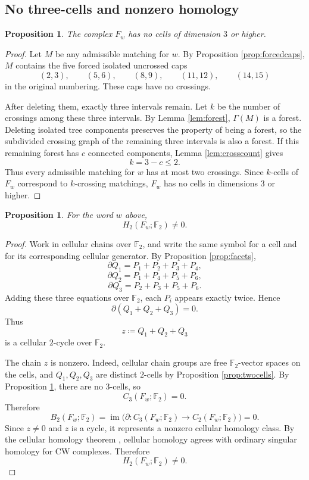 \documentclass[12pt]{article}
\newcommand{\Ftwo}{\mathbb{F}_2}
\newcommand{\defeq}{\coloneqq}
\newtheorem{proposition}[theorem]{Proposition}
\theoremstyle{definition}
\begin{document}
\subsection{No three-cells and nonzero homology}

\begin{proposition}\label{prop:nohigh}
The complex \(F_w\) has no cells of dimension \(3\) or higher.
\end{proposition}

\begin{proof}
Let \(M\) be any admissible matching for \(w\).  By Proposition \ref{prop:forcedcaps}, \(M\) contains the five forced isolated uncrossed caps
\[
(2,3),\qquad (5,6),\qquad (8,9),\qquad (11,12),\qquad (14,15)
\]
in the original numbering.  These caps have no crossings.

After deleting them, exactly three intervals remain.  Let \(k\) be the number of crossings among these three intervals.  By Lemma \ref{lem:forest}, \(\Gamma(M)\) is a forest.  Deleting isolated tree components preserves the property of being a forest, so the subdivided crossing graph of the remaining three intervals is also a forest.  If this remaining forest has \(c\) connected components, Lemma \ref{lem:crosscount} gives
\[
k=3-c\le 2.
\]
Thus every admissible matching for \(w\) has at most two crossings.  Since \(k\)-cells of \(F_w\) correspond to \(k\)-crossing matchings, \(F_w\) has no cells in dimensions \(3\) or higher.
\end{proof}

\begin{proposition}\label{prop:homology}
For the word \(w\) above,
\[
H_2(F_w;\Ftwo)\neq 0.
\]
\end{proposition}

\begin{proof}
Work in cellular chains over \(\Ftwo\), and write the same symbol for a cell and for its corresponding cellular generator.  By Proposition \ref{prop:facets},
\[
\partial Q_1=P_1+P_2+P_3+P_4,
\]
\[
\partial Q_2=P_1+P_4+P_5+P_6,
\]
\[
\partial Q_3=P_2+P_3+P_5+P_6.
\]
Adding these three equations over \(\Ftwo\), each \(P_i\) appears exactly twice.  Hence
\[
\partial(Q_1+Q_2+Q_3)=0.
\]
Thus
\[
z\defeq Q_1+Q_2+Q_3
\]
is a cellular \(2\)-cycle over \(\Ftwo\).

The chain \(z\) is nonzero.  Indeed, cellular chain groups are free \(\Ftwo\)-vector spaces on the cells, and \(Q_1,Q_2,Q_3\) are distinct \(2\)-cells by Proposition \ref{prop:twocells}.  By Proposition \ref{prop:nohigh}, there are no \(3\)-cells, so
\[
C_3(F_w;\Ftwo)=0.
\]
Therefore
\[
B_2(F_w;\Ftwo)=\operatorname{im}\bigl(\partial:C_3(F_w;\Ftwo)\to C_2(F_w;\Ftwo)\bigr)=0.
\]
Since \(z\neq 0\) and \(z\) is a cycle, it represents a nonzero cellular homology class.  By the cellular homology theorem \cite[Chapter 2]{Hatcher}, cellular homology agrees with ordinary singular homology for CW complexes.  Therefore
\[
H_2(F_w;\Ftwo)\neq 0.
\]
\end{proof}
\end{document}
